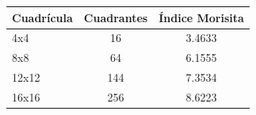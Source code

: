 \begin{tabular}{lcc}
\toprule
Cuadrícula & Cuadrantes & Índice Morisita \\
\midrule
4x4 & 16 & 3.4633 \\
8x8 & 64 & 6.1555 \\
12x12 & 144 & 7.3534 \\
16x16 & 256 & 8.6223 \\
\bottomrule
\end{tabular}